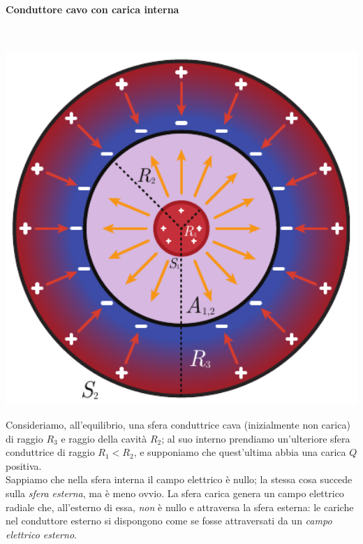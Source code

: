 \paragraph{Conduttore cavo con carica interna}~\\
\begin{minipage}{0.43\textwidth}
\begin{center}
	\includegraphics[width=1\textwidth]{images/chp4sferacavaconsfera.pdf}
\end{center}
\end{minipage}\hspace{10pt}
\begin{minipage}{0.56\textwidth}
Consideriamo, all'equilibrio, una sfera conduttrice cava (inizialmente non carica) di raggio $R_3$ e raggio della cavità $R_2$; al suo interno prendiamo un'ulteriore sfera conduttrice di raggio $R_1<R_2$, e supponiamo che quest'ultima abbia una carica $Q$ positiva.\\
Sappiamo che nella sfera interna il campo elettrico è nullo; la stessa cosa succede sulla \textit{sfera esterna}, ma è meno ovvio.	La sfera carica genera un campo elettrico radiale che, all'esterno di essa, \textit{non} è nullo e attraversa la sfera esterna: le cariche nel conduttore esterno si dispongono come se fosse attraversati da un \textit{campo elettrico esterno}.
\end{minipage}\\
